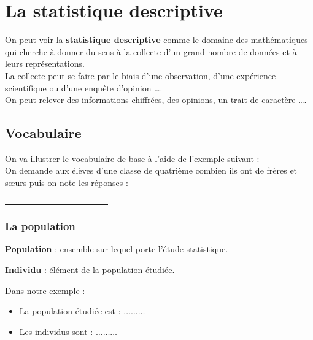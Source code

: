 \documentclass[a4paper]{book}
\begin{document}
\setcounter{chapter}{1}
\renewcommand{\monTitre}{La statistique descriptive}
\chapter{\monTitre}
\thispagestyle{fancy} 


On peut voir la \textbf{statistique descriptive} comme le domaine des mathématiques qui cherche à donner du sens à la collecte d’un grand nombre de données et à leurs représentations.  \\
La collecte peut se faire par le biais d’une observation, d’une expérience scientifique ou d’une enquête d’opinion \ldots.\\
On peut relever des informations chiffrées, des opinions, un trait de caractère \ldots.

\section{Vocabulaire}

    On va illustrer le vocabulaire de base à l'aide de l'exemple suivant : \\
    On demande aux élèves d'une classe de quatrième combien ils ont de frères et sœurs puis on note les
    réponses :
    
    \begin{tabular}{|p{0.5cm}|p{0.5cm}|p{0.5cm}|p{0.5cm}|p{0.5cm}|p{0.5cm}|p{0.5cm}|p{0.5cm}|p{0.5cm}|p{0.5cm}|p{0.5cm}|p{0.5cm}|}
        \hline
        & & & & & & & & & & & \\ \hline
        & & & & & & & & & & & \\ \hline
        & & & & & & & & & & & \\ \hline
    \end{tabular}

\subsection{La population}
    \begin{definition}
        \textbf{Population} : ensemble sur lequel porte l'étude statistique.
        
        \textbf{Individu} : élément de la population étudiée.
    \end{definition}
    
    Dans notre exemple :
    \begin{itemize}
        \item La population étudiée est : $\ldots\ldots\ldots$
        \item Les individus sont : $\ldots\ldots\ldots$
    \end{itemize}
    
\end{document}

